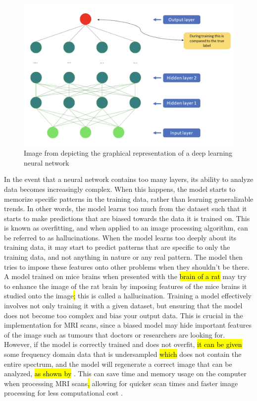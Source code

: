 \documentclass[14pt]{extreport}
\begin{document}
        \begin{figure}[h]
            \begin{center}
                \includegraphics[width = 0.6\linewidth]{Neural Network.png}
                \caption{Image from \cite{Lundervold_Lundervold_2019} depicting the graphical representation of a deep learning neural network}
            \end{center}
        \end{figure}

        In the event that a neural network contains too many layers, its ability to analyze data becomes increasingly complex. When this happens, the model starts to memorize specific patterns in the training data, rather than learning generalizable trends. In other words, the model learns too much from the dataset such that it starts to make predictions that are biased towards the data it is trained on. This is known as overfitting, and when applied to an image processing algorithm, can be referred to as hallucinations. When the model learns too deeply about its training data, it may start to predict patterns that are specific to only the training data, and not anything in nature or any real pattern. The model then tries to impose these features onto other problems when they shouldn't be there. A model trained on mice brains when presented with the \hl{brain of a rat} may try to enhance the image of the rat brain by imposing features of the mice brains it studied onto the image\hl{;} this is called a hallucination. Training a model effectively involves not only training it with a given dataset, but ensuring that the model does not become too complex and bias your output data. This is crucial in the implementation for MRI scans, since a biased model may hide important features of the image such as tumours that doctors or researchers are looking for. However, if the model is correctly trained and does not overfit, \hl{it can be given} some frequency domain data that is undersampled \hl{which} does not contain the entire spectrum, and the model will regenerate a correct image that can be analyzed, \hl{as shown by} \cite{Hyun_Kim_Lee_Lee_Seo_2018}. This can save time and memory usage on the computer when processing MRI scans\hl{,} allowing for quicker scan times and faster image processing for less computational cost \cite{Hyun_Kim_Lee_Lee_Seo_2018}. 
\end{document}
